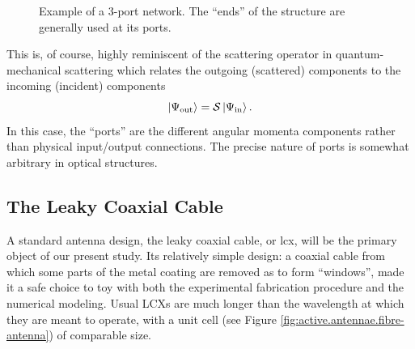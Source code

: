 \begin{figure}
 \begin{center}
 \end{center}
 \caption[Example of a 3-port network]{Example of a 3-port network. The ``ends'' of the structure are generally used at its ports.}
 \label{fig:active.antennae.network}
\end{figure} 

This is, of course, highly reminiscent of the scattering operator
in quantum-mechanical scattering which relates the outgoing (scattered)
components to the incoming (incident) components
  \begin{equation}
   \Ket{\Psi_\text{out}}=\mathcal{S}\Ket{\Psi_\text{in}}.
  \end{equation}
In this case, the ``ports'' are the different angular momenta
components rather than physical input/output connections. 
The precise nature of ports is somewhat arbitrary in optical structures.

\subsection{The Leaky Coaxial Cable}
A standard antenna design, the leaky coaxial cable, or \gls{lcx}, will be the primary 
object of our present study. Its relatively simple design: a coaxial cable from which
some parts of the metal coating are removed as to form ``windows'', made it a safe choice
to toy with both the experimental fabrication procedure and the numerical modeling. 
Usual LCXs are much longer than the wavelength at which they are meant to operate, with 
a unit cell (see Figure \ref{fig:active.antennae.fibre-antenna}) of comparable size.

